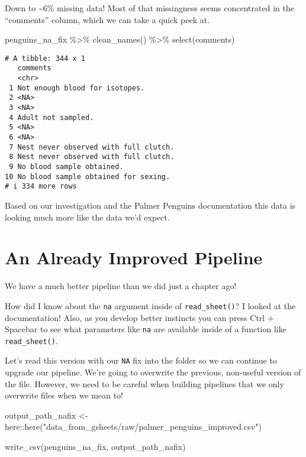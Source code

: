 \documentclass[
  letterpaper,
  DIV=11,
  numbers=noendperiod]{scrreprt}
\newenvironment{Shaded}{\begin{snugshade}}{\end{snugshade}}
\newcommand{\FunctionTok}[1]{\textcolor[rgb]{0.28,0.35,0.67}{#1}}
\newcommand{\NormalTok}[1]{\textcolor[rgb]{0.00,0.23,0.31}{#1}}
\newcommand{\OtherTok}[1]{\textcolor[rgb]{0.00,0.23,0.31}{#1}}
\newcommand{\SpecialCharTok}[1]{\textcolor[rgb]{0.37,0.37,0.37}{#1}}
\newcommand{\StringTok}[1]{\textcolor[rgb]{0.13,0.47,0.30}{#1}}
\begin{document}
Down to \textasciitilde6\% missing data! Most of that missingness seems
concentrated in the ``comments'' column, which we can take a quick peek
at.

\begin{Shaded}
\begin{Highlighting}[]
\NormalTok{penguins\_na\_fix }\SpecialCharTok{\%\textgreater{}\%} 
  \FunctionTok{clean\_names}\NormalTok{() }\SpecialCharTok{\%\textgreater{}\%} 
  \FunctionTok{select}\NormalTok{(comments)}
\end{Highlighting}
\end{Shaded}

\begin{verbatim}
# A tibble: 344 x 1
   comments                             
   <chr>                                
 1 Not enough blood for isotopes.       
 2 <NA>                                 
 3 <NA>                                 
 4 Adult not sampled.                   
 5 <NA>                                 
 6 <NA>                                 
 7 Nest never observed with full clutch.
 8 Nest never observed with full clutch.
 9 No blood sample obtained.            
10 No blood sample obtained for sexing. 
# i 334 more rows
\end{verbatim}

Based on our investigation and the Palmer Penguins documentation this
data is looking much more like the data we'd expect.

\hypertarget{an-already-improved-pipeline}{%
\section{An Already Improved
Pipeline}\label{an-already-improved-pipeline}}

We have a much better pipeline than we did just a chapter ago!

How did I know about the \texttt{na} argument inside of
\texttt{read\_sheet()}? I looked at the documentation! Also, as you
develop better instincts you can press Ctrl + Spacebar to see what
parameters like \texttt{na} are available inside of a function like
\texttt{read\_sheet()}.

Let's read this version with our \texttt{NA} fix into the folder so we
can continue to upgrade our pipeline. We're going to overwrite the
previous, non-useful version of the file. However, we need to be careful
when building pipelines that we only overwrite files when we mean to!

\begin{Shaded}
\begin{Highlighting}[]
\NormalTok{output\_path\_nafix }\OtherTok{\textless{}{-}}\NormalTok{ here}\SpecialCharTok{::}\FunctionTok{here}\NormalTok{(}\StringTok{"data\_from\_gsheets/raw/palmer\_penguins\_improved.csv"}\NormalTok{)}

\FunctionTok{write\_csv}\NormalTok{(penguins\_na\_fix, output\_path\_nafix)}
\end{Highlighting}
\end{Shaded}
\end{document}
